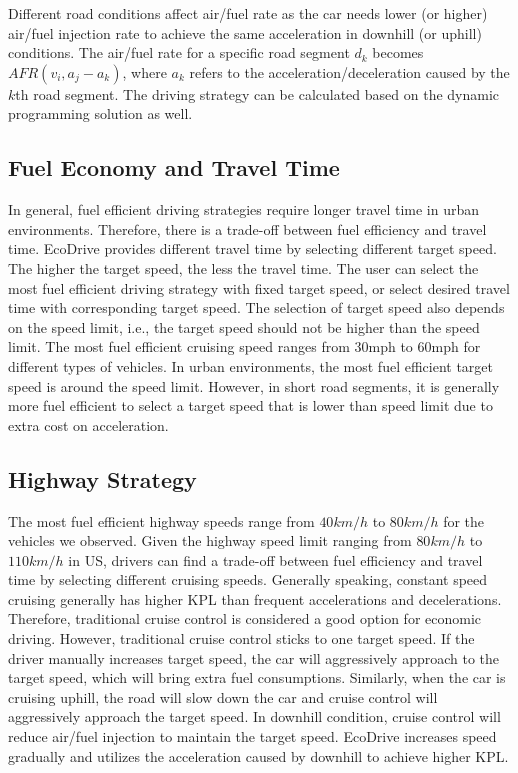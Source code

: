 Different road conditions affect air/fuel rate as the car needs
lower (or higher) air/fuel injection rate to achieve the same acceleration
in downhill (or uphill) conditions.  
The air/fuel rate for a specific road segment $d_k$ becomes $AFR(v_i, a_j - a_k)$, 
where $a_k$ refers to the acceleration/deceleration caused by the $k$th road segment. 
The driving strategy can be calculated based on the dynamic programming solution as well.  

\subsection{Fuel Economy and Travel Time}


In general, fuel efficient driving
strategies require longer travel time in urban environments. 
Therefore, there is a trade-off between fuel efficiency 
and travel time. 
EcoDrive provides different travel time by selecting different
target speed. 
The higher the target speed, the less the travel time. 
The user can select the most fuel efficient driving
strategy with fixed target speed, 
or select desired travel time with corresponding target speed. 
The selection of target speed also depends on the speed limit,
i.e., the target speed should not be higher than the speed limit. 
The most fuel efficient cruising speed ranges from 30mph to 60mph
for different types of vehicles. 
In urban environments, the most fuel efficient target speed
is around the speed limit. 
However, in short road segments, it is generally more fuel efficient to
select a target speed that is lower than speed limit 
due to extra cost on acceleration. 



\subsection{Highway Strategy}

The most fuel efficient highway speeds range from $40km/h$ to $80km/h$ 
for the vehicles we observed.  
Given the highway speed limit ranging from $80km/h$ to $110km/h$ in US, 
drivers can find a trade-off between fuel efficiency and travel time
by selecting different cruising speeds. 
Generally speaking, constant speed cruising generally has higher KPL
than frequent accelerations and decelerations. 
Therefore, traditional cruise control is considered a good option for economic driving. 
However, traditional cruise control sticks to one target speed. 
If the driver manually increases target speed, the car will aggressively 
approach to the target speed, which will bring extra fuel consumptions. 
Similarly, when the car is cruising uphill, the road will slow down
the car and cruise control will aggressively approach the target speed. 
In downhill condition, cruise control will reduce air/fuel injection
to maintain the target speed. 
EcoDrive increases speed gradually and utilizes the acceleration caused by downhill
to achieve higher KPL.  



